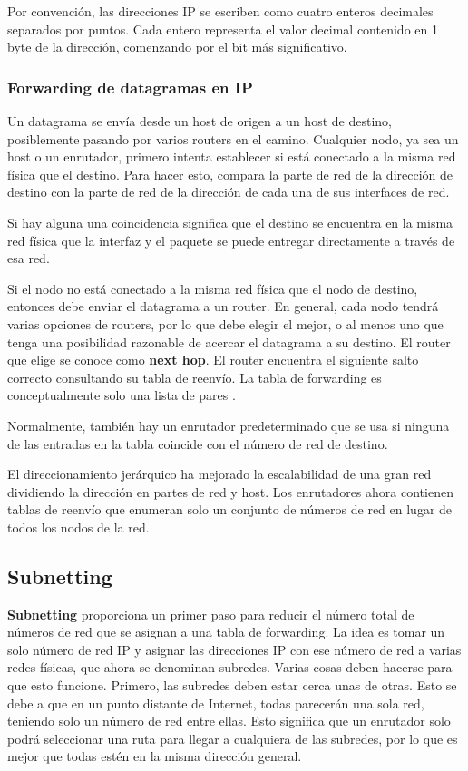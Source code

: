 Por convención, las direcciones IP se escriben como cuatro enteros decimales separados por puntos. Cada entero representa el valor decimal contenido en 1 byte de la dirección, comenzando por el bit más significativo.

\subsubsection{Forwarding de datagramas en IP}
Un datagrama se envía desde un host de origen a un host de destino, posiblemente pasando por varios routers en el camino. Cualquier nodo, ya sea un host o un enrutador, primero intenta establecer si está conectado a la misma red física que el destino. Para hacer esto, compara la parte de red de la dirección de destino con la parte de red de la dirección de cada una de sus interfaces de red.

Si hay alguna una coincidencia significa que el destino se encuentra en la misma red física que la interfaz y el paquete se puede entregar directamente a través de esa red.

Si el nodo no está conectado a la misma red física que el nodo de destino, entonces debe enviar el datagrama a un router. En general, cada nodo tendrá varias opciones de routers, por lo que debe elegir el mejor, o al menos uno que tenga una posibilidad razonable de acercar el datagrama a su destino. El router que elige se conoce como \textbf{next hop}. El router encuentra el siguiente salto correcto consultando su tabla de reenvío. La tabla de forwarding es conceptualmente solo una lista de pares \(<NetworkNum, NextHop>\).

Normalmente, también hay un enrutador predeterminado que se usa si ninguna de las entradas en la tabla coincide con el número de red de destino.

El direccionamiento jerárquico ha mejorado la escalabilidad de una gran red dividiendo la dirección en partes de red y host. Los enrutadores ahora contienen tablas de reenvío que enumeran solo un conjunto de números de red en lugar de todos los nodos de la red.

\subsection{Subnetting}
\textbf{Subnetting} proporciona un primer paso para reducir el número total de números de red que se asignan a una tabla de forwarding. La idea es tomar un solo número de red IP y asignar las direcciones IP con ese número de red a varias redes físicas, que ahora se denominan subredes. Varias cosas deben hacerse para que esto funcione. Primero, las subredes deben estar cerca unas de otras. Esto se debe a que en un punto distante de Internet, todas parecerán una sola red, teniendo solo un número de red entre ellas. Esto significa que un enrutador solo podrá seleccionar una ruta para llegar a cualquiera de las subredes, por lo que es mejor que todas estén en la misma dirección general.

